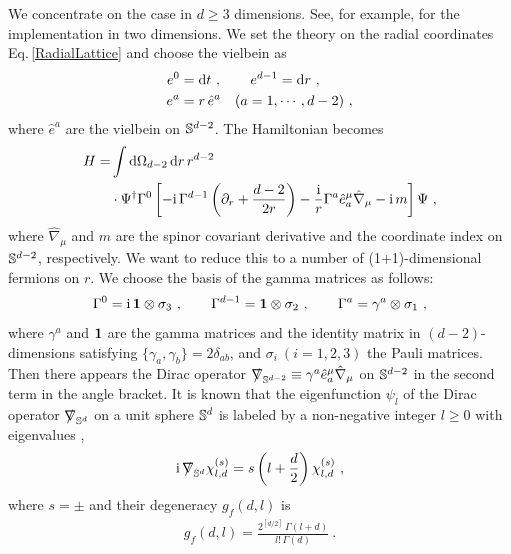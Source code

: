 We concentrate on the case in $d\ge 3$ dimensions. 
See, for example, \textcite{Herzog:2013py} for the implementation in two dimensions.
We set the theory on the radial coordinates Eq.\,\eqref{RadialLattice} and choose the vielbein as
\begin{align}
\begin{aligned}
	e^0 &= \mathrm{d} t \ , \qquad e^{d-1} = \mathrm{d} r \ , \\
	e^a &= r\, \hat e^a\quad (a=1,\cdots,d-2) \ ,
\end{aligned}
\end{align}
where $\hat e^a$ are the vielbein on $\mathbb{S}^{d-2}$.
The Hamiltonian becomes
\begin{align}
\begin{aligned}
	H = &\int \mathrm{d}\Omega_{d-2}\,\mathrm{d} r\,r^{d-2} \\
		&\cdot \Psi^\dagger \Gamma^0\left[ - \mathrm{i}\,  \Gamma^{d-1} \left(\partial_r + \frac{d-2}{2r}\right) -  \frac{\mathrm{i}}{r} \Gamma^a \hat e_a^\mu \hat \nabla_\mu  - \mathrm{i}\, m\right] \Psi  \ ,
\end{aligned}
\end{align}
where $\hat \nabla_\mu$ and $m$ are the spinor covariant derivative and the coordinate index on $\mathbb{S}^{d-2}$, respectively.
We want to reduce this to a number of (1+1)-dimensional fermions on $r$.
We choose the basis of the gamma matrices as follows:
\begin{align}
	\Gamma^0 = \mathrm{i}\,{\bf 1} \otimes \sigma_3\ , \qquad 
	\Gamma^{d-1} = {\bf 1} \otimes  \sigma_2 \ , \qquad 		
	\Gamma^a = \gamma^a \otimes \sigma_1\ ,
\end{align}
where $\gamma^a$ and ${\bf 1}$ are the gamma matrices and the identity matrix in $(d-2)$-dimensions satisfying $\{\gamma_a, \gamma_b\} = 2\delta_{ab}$, and $\sigma_i~(i=1,2,3)$ the Pauli matrices.
Then there appears the Dirac operator $\nslash_{\BS^{d-2}}\equiv \gamma^a \hat e_a^\mu \hat \nabla_\mu$ on $\mathbb{S}^{d-2}$ in the second term in the angle bracket. 
It is known that the eigenfunction $\psi_l$ of the Dirac operator $\nslash_{\BS^{d}}$ on a unit sphere $\mathbb{S}^{d}$ is labeled by a non-negative integer $l\ge 0$ with eigenvalues \cite{Camporesi:1995fb},
\begin{align}
	\i\,  \nslash_{\BS^{d}} \chi_{l,d}^{(s)} = s \left( l + \frac{d}{2}\right) \chi_{l,d}^{(s)} \ ,
\end{align}
where $s=\pm$ and their degeneracy $g_f(d,l)$ is 
\begin{align}\label{FermiDeg}
	g_f(d,l) = \frac{2^{[d/2]}\, \Gamma(l + d )}{l! \,\Gamma (d)}  \ .
\end{align}
